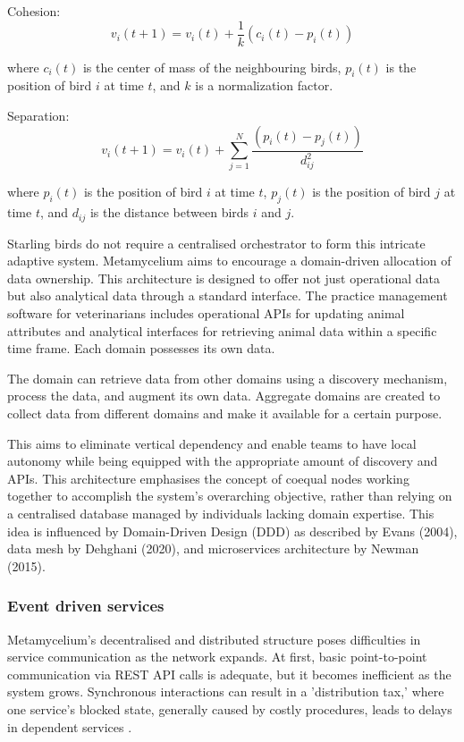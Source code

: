 \documentclass[journal]{IEEEtran}
\begin{document}
Cohesion:
$$
v_i(t+1) = v_i(t) + \frac{1}{k} (c_i(t) - p_i(t))
$$

where $c_i(t)$ is the center of mass of the neighbouring birds, $p_i(t)$ is the position of bird $i$ at time $t$, and $k$ is a normalization factor.

Separation:
$$
v_i(t+1) = v_i(t) + \sum_{j=1}^{N} \frac{(p_i(t) - p_j(t))}{d_{ij}^2}
$$

where $p_i(t)$ is the position of bird $i$ at time $t$, $p_j(t)$ is the position of bird $j$ at time $t$, and $d_{ij}$ is the distance between birds $i$ and $j$.

Starling birds do not require a centralised orchestrator to form this intricate adaptive system. Metamycelium aims to encourage a domain-driven allocation of data ownership. This architecture is designed to offer not just operational data but also analytical data through a standard interface. The practice management software for veterinarians includes operational APIs for updating animal attributes and analytical interfaces for retrieving animal data within a specific time frame. Each domain possesses its own data.

The domain can retrieve data from other domains using a discovery mechanism, process the data, and augment its own data. Aggregate domains are created to collect data from different domains and make it available for a certain purpose. 

This aims to eliminate vertical dependency and enable teams to have local autonomy while being equipped with the appropriate amount of discovery and APIs. This architecture emphasises the concept of coequal nodes working together to accomplish the system's overarching objective, rather than relying on a centralised database managed by individuals lacking domain expertise. This idea is influenced by Domain-Driven Design (DDD) as described by Evans (2004), data mesh by Dehghani (2020), and microservices architecture by Newman (2015).

\subsubsection{Event driven services}

Metamycelium's decentralised and distributed structure poses difficulties in service communication as the network expands. At first, basic point-to-point communication via REST API calls is adequate, but it becomes inefficient as the system grows. Synchronous interactions can result in a 'distribution tax,' where one service's blocked state, generally caused by costly procedures, leads to delays in dependent services \cite{montesi2016circuit}.
\end{document}
